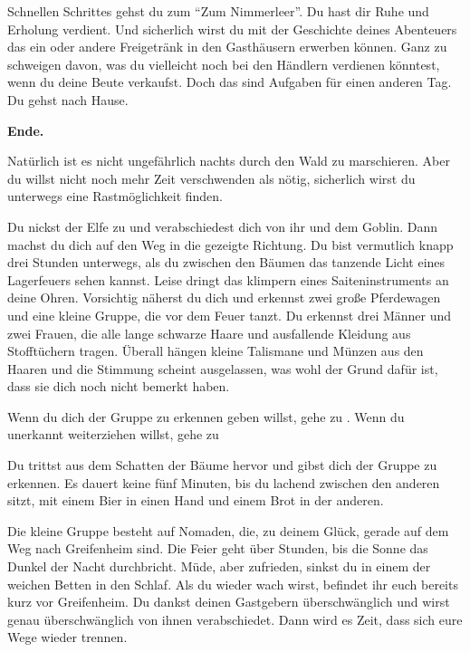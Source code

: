 Schnellen Schrittes gehst du zum ``Zum Nimmerleer''. Du hast dir Ruhe und Erholung verdient. Und sicherlich wirst du mit der Geschichte deines Abenteuers das ein oder andere Freigetränk in den Gasthäusern erwerben können. Ganz zu schweigen davon, was du vielleicht noch bei den Händlern verdienen könntest, wenn du deine Beute verkaufst. Doch das sind Aufgaben für einen anderen Tag. Du gehst nach Hause.

\textbf{Ende.}


Natürlich ist es nicht ungefährlich nachts durch den Wald zu marschieren. Aber du willst nicht noch mehr Zeit verschwenden als nötig, sicherlich wirst du unterwegs eine Rastmöglichkeit finden.

Du nickst der Elfe zu und verabschiedest dich von ihr und dem Goblin. Dann machst du dich auf den Weg in die gezeigte Richtung. Du bist vermutlich knapp drei Stunden unterwegs, als du zwischen den Bäumen das tanzende Licht eines Lagerfeuers sehen kannst. Leise dringt das klimpern eines Saiteninstruments an deine Ohren. Vorsichtig näherst du dich und erkennst zwei große Pferdewagen und eine kleine Gruppe, die vor dem Feuer tanzt. Du erkennst drei Männer und zwei Frauen, die alle lange schwarze Haare und ausfallende Kleidung aus Stofftüchern tragen. Überall hängen kleine Talismane und Münzen aus den Haaren und die Stimmung scheint ausgelassen, was wohl der Grund dafür ist, dass sie dich noch nicht bemerkt haben.

Wenn du dich der Gruppe zu erkennen geben willst, gehe zu .
Wenn du unerkannt weiterziehen willst, gehe zu 


Du trittst aus dem Schatten der Bäume hervor und gibst dich der Gruppe zu erkennen. Es dauert keine fünf Minuten, bis du lachend zwischen den anderen sitzt, mit einem Bier in einen Hand und einem Brot in der anderen.

Die kleine Gruppe besteht auf Nomaden, die, zu deinem Glück, gerade auf dem Weg nach Greifenheim sind. Die Feier geht über Stunden, bis die Sonne das Dunkel der Nacht durchbricht. Müde, aber zufrieden, sinkst du in einem der weichen Betten in den Schlaf. Als du wieder wach wirst, befindet ihr euch bereits kurz vor Greifenheim. Du dankst deinen Gastgebern überschwänglich und wirst genau überschwänglich von ihnen verabschiedet. Dann wird es Zeit, dass sich eure Wege wieder trennen.

